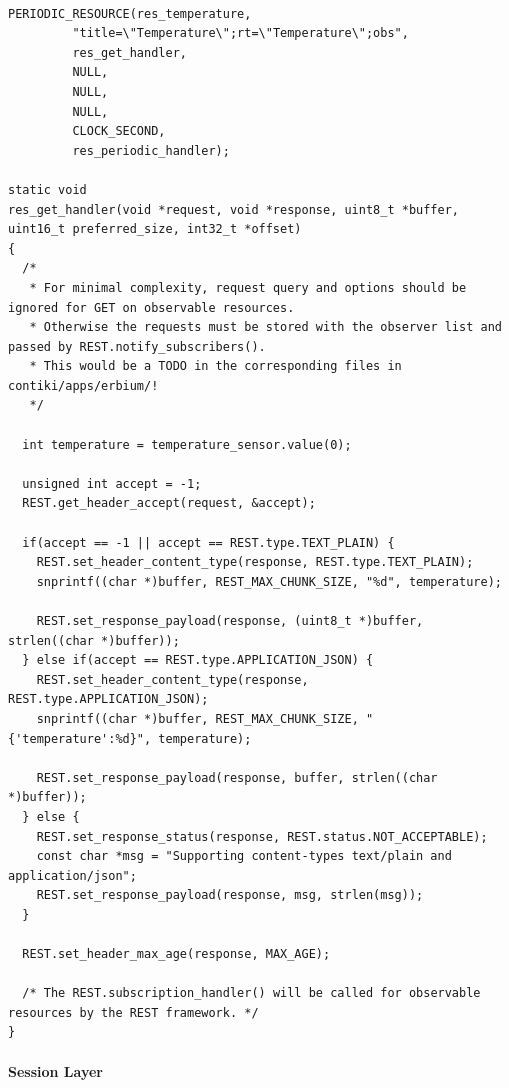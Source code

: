 \begin{lstlisting}

PERIODIC_RESOURCE(res_temperature,
         "title=\"Temperature\";rt=\"Temperature\";obs",
         res_get_handler,
         NULL,
         NULL,
         NULL,
         CLOCK_SECOND,
         res_periodic_handler);

static void
res_get_handler(void *request, void *response, uint8_t *buffer, uint16_t preferred_size, int32_t *offset)
{
  /*
   * For minimal complexity, request query and options should be ignored for GET on observable resources.
   * Otherwise the requests must be stored with the observer list and passed by REST.notify_subscribers().
   * This would be a TODO in the corresponding files in contiki/apps/erbium/!
   */

  int temperature = temperature_sensor.value(0);

  unsigned int accept = -1;
  REST.get_header_accept(request, &accept);

  if(accept == -1 || accept == REST.type.TEXT_PLAIN) {
    REST.set_header_content_type(response, REST.type.TEXT_PLAIN);
    snprintf((char *)buffer, REST_MAX_CHUNK_SIZE, "%d", temperature);

    REST.set_response_payload(response, (uint8_t *)buffer, strlen((char *)buffer));
  } else if(accept == REST.type.APPLICATION_JSON) {
    REST.set_header_content_type(response, REST.type.APPLICATION_JSON);
    snprintf((char *)buffer, REST_MAX_CHUNK_SIZE, "{'temperature':%d}", temperature);

    REST.set_response_payload(response, buffer, strlen((char *)buffer));
  } else {
    REST.set_response_status(response, REST.status.NOT_ACCEPTABLE);
    const char *msg = "Supporting content-types text/plain and application/json";
    REST.set_response_payload(response, msg, strlen(msg));
  }

  REST.set_header_max_age(response, MAX_AGE);

  /* The REST.subscription_handler() will be called for observable resources by the REST framework. */
}
\end{lstlisting}

\paragraph{\textbf{Session Layer}}
\paragraph{}

